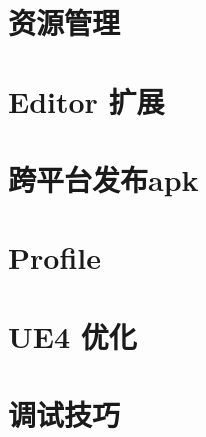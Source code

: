\documentclass[UTF8,a4paper,12pt]{ctexbook}
\begin{document}
\chapter{资源管理}

\chapter{Editor 扩展}
		
\chapter{跨平台发布apk}

\chapter{Profile}
	
\chapter{UE4 优化}

\chapter{调试技巧}
	
	
	
	
	
\end{document}

